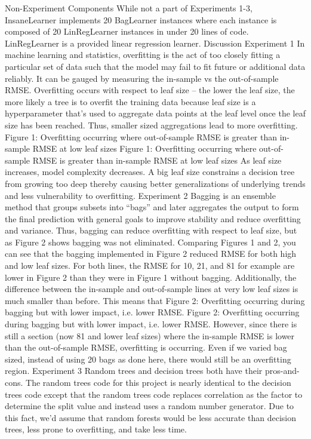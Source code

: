\documentclass{article}
\begin{document}
Non-Experiment Components
While not a part of Experiments 1-3, InsaneLearner implements 20 BagLearner instances where each instance is composed of 20 LinRegLearner instances in under 20 lines of code. LinRegLearner is a provided linear regression learner.
Discussion
Experiment 1
In machine learning and statistics, overfitting is the act of too closely fitting a particular set of data such that the model may fail to fit future or additional data reliably. It can be gauged by measuring the in-sample vs the out-of-sample RMSE.
Overfitting occurs with respect to leaf size – the lower the leaf size, the more likely a tree is to overfit the training data because leaf size is a hyperparameter that’s used to aggregate data points at the leaf level once the leaf size has been reached. Thus, smaller sized aggregations lead to more overfitting.
Figure 1: Overfitting occurring where out-of-sample RMSE is greater than in-sample RMSE at low leaf sizes
Figure 1: Overfitting occurring where out-of-sample RMSE is greater than in-sample RMSE at low leaf sizes
As leaf size increases, model complexity decreases. A big leaf size constrains a decision tree from growing too deep thereby causing better generalizations of underlying trends and less vulnerability to overfitting.
Experiment 2
Bagging is an ensemble method that groups subsets into “bags” and later aggregates the output to form the final prediction with general goals to improve stability and reduce overfitting and variance. Thus, bagging can reduce overfitting with respect to leaf size, but as Figure 2 shows bagging was not eliminated. 
Comparing Figures 1 and 2, you can see that the bagging implemented in Figure 2 reduced RMSE for both high and low leaf sizes. For both lines, the RMSE for 10, 21, and 81 for example are lower in Figure 2 than they were in Figure 1 without bagging. Additionally, the difference between the in-sample and out-of-sample lines at very low leaf sizes is much smaller than before. This means that Figure 2: Overfitting occurring during bagging but with lower impact, i.e. lower RMSE.
Figure 2: Overfitting occurring during bagging but with lower impact, i.e. lower RMSE.
However, since there is still a section (now 81 and lower leaf sizes) where the in-sample RMSE is lower than the out-of-sample RMSE, overfitting is occurring. Even if we varied bag sized, instead of using 20 bags as done here, there would still be an overfitting region.
Experiment 3
Random trees and decision trees both have their pros-and-cons. The random trees code for this project is nearly identical to the decision trees code except that the random trees code replaces correlation as the factor to determine the split value and instead uses a random number generator. Due to this fact, we’d assume that random forests would be less accurate than decision trees, less prone to overfitting, and take less time.
\end{document}
